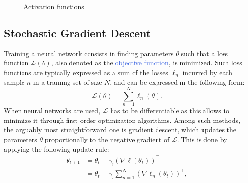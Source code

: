 \begin{figure}[ht!]
	\centering
	
\caption{Activation functions}
\label{fig:activation_functions}
\end{figure}

\subsection{Stochastic Gradient Descent}
\label{sec:sgd}

Training a neural network consists in finding parameters $\theta$ such that a loss function $\mathscr{L}(\theta)$, also denoted as the \textcolor{RoyalBlue}{objective function}, is minimized. Such loss functions are typically expressed as a sum of the losses $\ell_n$ incurred by each sample $n$ in a training set of size $N$, and can be expressed in the following form:
\begin{equation}
	\mathscr{L}(\theta) = \sum_{n=1}^{N}\ell_n(\theta).
	\label{eq:sum_of_losses}
\end{equation}
When neural networks are used, $\mathscr{L}$ has to be differentiable as this allows to minimize it through first order optimization algorithms. Among such methods, the arguably most straightforward one is gradient descent, which updates the parameters $\theta$ proportionally to the negative gradient of $\mathscr{L}$. This is done by applying the following update rule:
\begin{equation}
	\begin{split}
	\theta_{t+1} & = \theta_t - \gamma_t(\nabla\ell(\theta_t))^{\intercal} \\ 
	& = \theta_t - \gamma_t \sum_{n=1}^{N}(\nabla \ell_n(\theta_t))^{\intercal},
	\end{split}
	\label{eq:gradient_descent}
\end{equation}
